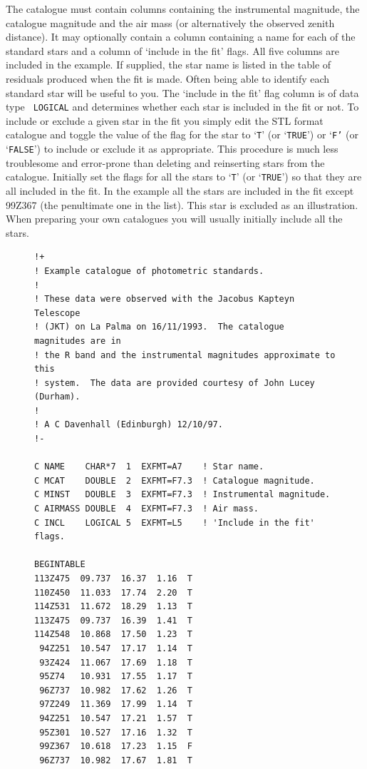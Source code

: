 \documentclass[twoside,11pt]{article}
\begin{document}
\begin{enumerate}
\begin{description}
     The catalogue must contain columns containing the instrumental magnitude,
     the catalogue magnitude and the air mass (or alternatively the observed
     zenith distance).  It may optionally contain a column containing a name
     for each of the standard stars and a column of `include in the fit'
     flags.  All five columns are included in the example.  If supplied, the
     star name is listed in the table of residuals produced when the fit is
     made.  Often being able to identify each standard star will be useful
     to you.  The `include in the fit' flag column is of data type {\tt
     LOGICAL} and determines whether each star is included in the fit or
     not.  To include or exclude a given star in the fit you simply edit
     the STL format catalogue and toggle the value of the flag for the
     star to `{\tt T}' (or `{\tt TRUE}') or `{\tt F'} (or `{\tt FALSE}') to
     include or exclude it as appropriate.  This procedure is much less
     troublesome and error-prone than deleting and reinserting stars from
     the catalogue.  Initially set the flags for all the stars to `{\tt T}'
     (or `{\tt TRUE}') so that they are all included in the fit.  In the
     example all the stars are included in the fit except 99Z367 (the
     penultimate one in the list).  This star is excluded as an illustration.
     When preparing your own catalogues you will usually initially include all
     the stars.

\begin{figure}[htbp]

\begin{verbatim}
!+
! Example catalogue of photometric standards.
!
! These data were observed with the Jacobus Kapteyn Telescope
! (JKT) on La Palma on 16/11/1993.  The catalogue magnitudes are in
! the R band and the instrumental magnitudes approximate to this
! system.  The data are provided courtesy of John Lucey (Durham).
!
! A C Davenhall (Edinburgh) 12/10/97.
!-

C NAME    CHAR*7  1  EXFMT=A7    ! Star name.
C MCAT    DOUBLE  2  EXFMT=F7.3  ! Catalogue magnitude.
C MINST   DOUBLE  3  EXFMT=F7.3  ! Instrumental magnitude.
C AIRMASS DOUBLE  4  EXFMT=F7.3  ! Air mass.
C INCL    LOGICAL 5  EXFMT=L5    ! 'Include in the fit' flags.

BEGINTABLE
113Z475  09.737  16.37  1.16  T
110Z450  11.033  17.74  2.20  T
114Z531  11.672  18.29  1.13  T
113Z475  09.737  16.39  1.41  T
114Z548  10.868  17.50  1.23  T
 94Z251  10.547  17.17  1.14  T
 93Z424  11.067  17.69  1.18  T
 95Z74   10.931  17.55  1.17  T
 96Z737  10.982  17.62  1.26  T
 97Z249  11.369  17.99  1.14  T
 94Z251  10.547  17.21  1.57  T
 95Z301  10.527  17.16  1.32  T
 99Z367  10.618  17.23  1.15  F
 96Z737  10.982  17.67  1.81  T
\end{verbatim}


\end{figure}
\end{description}
\end{enumerate}
\end{document}
